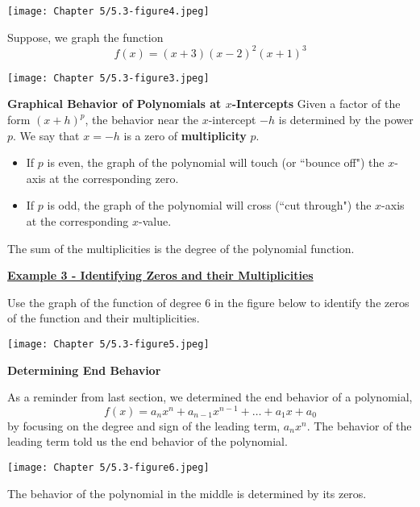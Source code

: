 \documentclass[12pt]{book}
\begin{document}
\centerline{\texttt{[image: Chapter 5/5.3-figure4.jpeg]}}



\newpage

Suppose, we graph the function $$f(x)=(x+3)(x-2)^2(x+1)^3$$


\texttt{[image: Chapter 5/5.3-figure3.jpeg]}


\vspace{70mm}
\begin{boxR}
   \textbf{Graphical Behavior of Polynomials at $x$-Intercepts}
    \vspace{1mm}
    \hline
    \vspace{2mm}
    Given a factor of the form $(x+h)^p$, the behavior near the $x$-intercept $-h$ is determined by the power $p$.
  We say that $x=-h$ is a zero of \textbf{multiplicity} $p$.
 \begin{itemize}
     \item If $p$ is even, the graph of the polynomial will touch (or ``bounce off") the $x$-axis at the corresponding zero.
     \item If $p$ is odd, the graph of the polynomial will cross (``cut through") the $x$-axis at the corresponding $x$-value.
 \end{itemize}

The sum of the multiplicities is the degree of the polynomial function.
\end{boxR}

\newpage

\underline{\textbf{Example 3 - Identifying Zeros and their Multiplicities}}

Use the graph of the function of degree $6$ in the figure below to identify the zeros of the function and their multiplicities. 

\texttt{[image: Chapter 5/5.3-figure5.jpeg]}


\newpage
{\large \textbf{Determining End Behavior}}

As a reminder from last section, we determined the end behavior of a polynomial,
$$ f(x) = a_nx^n + a_{n-1}x^{n-1} + \ldots + a_1x+a_0$$ by focusing on the degree and sign of the leading term, $a_nx^n$. The behavior of the leading term told us the end behavior of the polynomial.

\vspace{5mm}

\centerline{\texttt{[image: Chapter 5/5.3-figure6.jpeg]}}

The behavior of the polynomial in the middle is determined by its zeros.
\end{document}
